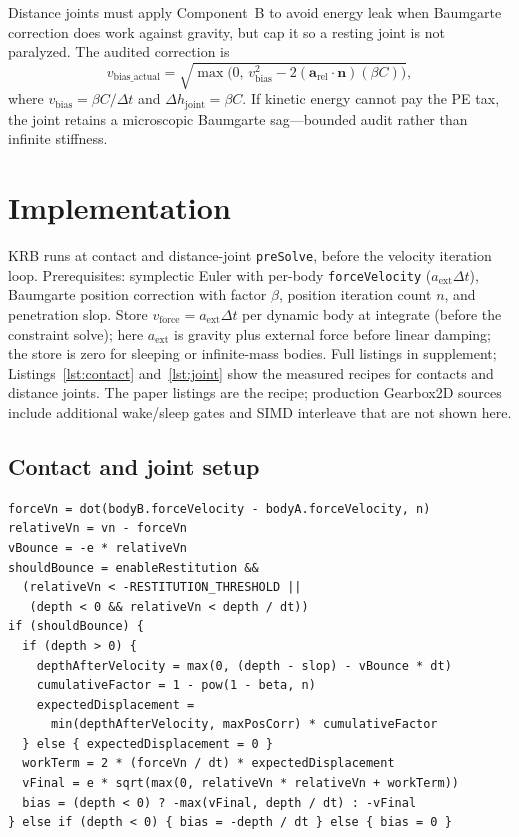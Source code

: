 \documentclass{jcgt}
\begin{document}
Distance joints must apply Component~B to avoid energy leak when Baumgarte correction does work against gravity, but cap it so a resting joint is not paralyzed. The audited correction is
\begin{equation}
v_{\mathrm{bias\_actual}} = \sqrt{\max\bigl(0,\, v_{\mathrm{bias}}^2 - 2 (\mathbf{a}_{\mathrm{rel}} \cdot \mathbf{n}) (\beta C)\bigr)},
\label{eq:joint_bias}
\end{equation}
where $v_{\mathrm{bias}} = \beta C / \Delta t$ and $\Delta h_{\mathrm{joint}} = \beta C$. If kinetic energy cannot pay the PE tax, the joint retains a microscopic Baumgarte sag---bounded audit rather than infinite stiffness.

\section{Implementation}
\label{sec:implementation}

KRB runs at contact and distance-joint \texttt{preSolve}, before the velocity iteration loop. Prerequisites: symplectic Euler with per-body \texttt{forceVelocity} ($a_{\mathrm{ext}} \Delta t$), Baumgarte position correction with factor $\beta$, position iteration count $n$, and penetration slop. Store $v_{\mathrm{force}} = a_{\mathrm{ext}}\Delta t$ per dynamic body at integrate (before the constraint solve); here $a_{\mathrm{ext}}$ is gravity plus external force before linear damping; the store is zero for sleeping or infinite-mass bodies. Full listings in supplement; Listings~\ref{lst:contact} and~\ref{lst:joint} show the measured recipes for contacts and distance joints. The paper listings are the recipe; production Gearbox2D sources include additional wake/sleep gates and SIMD interleave that are not shown here.

\subsection{Contact and joint setup}

\lstset{
	basicstyle=\footnotesize\ttfamily,
	aboveskip=2pt,
	belowskip=2pt,
	float=false,
	breaklines=true,
	breakatwhitespace=true,
	columns=flexible,
	mathescape=false,
	texcl=false,
	showstringspaces=false
}

\begin{lstlisting}[caption={Contact \texttt{preSolve} bias (Component A + B).},label={lst:contact}]
forceVn = dot(bodyB.forceVelocity - bodyA.forceVelocity, n)
relativeVn = vn - forceVn
vBounce = -e * relativeVn
shouldBounce = enableRestitution &&
  (relativeVn < -RESTITUTION_THRESHOLD ||
   (depth < 0 && relativeVn < depth / dt))
if (shouldBounce) {
  if (depth > 0) {
    depthAfterVelocity = max(0, (depth - slop) - vBounce * dt)
    cumulativeFactor = 1 - pow(1 - beta, n)
    expectedDisplacement =
      min(depthAfterVelocity, maxPosCorr) * cumulativeFactor
  } else { expectedDisplacement = 0 }
  workTerm = 2 * (forceVn / dt) * expectedDisplacement
  vFinal = e * sqrt(max(0, relativeVn * relativeVn + workTerm))
  bias = (depth < 0) ? -max(vFinal, depth / dt) : -vFinal
} else if (depth < 0) { bias = -depth / dt } else { bias = 0 }
\end{lstlisting}
\end{document}
